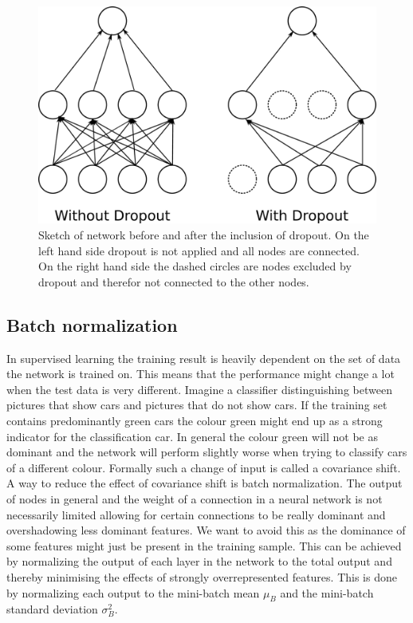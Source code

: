 \begin{figure}
	\centering
	\includegraphics[scale = 0.1]{figures_ML/dropout.eps}
	\caption{Sketch of network before and after the inclusion of dropout. On the left hand side dropout is not applied and all nodes are connected. On the right hand side the dashed circles are nodes excluded by dropout and therefor not connected to the other nodes.}
	\label{fig:dropout}
\end{figure}



\subsection{Batch normalization}
\label{sec:batch_norm}

In supervised learning the training result is heavily dependent on the set of data the network is trained on. This means that the performance might change a lot when the test data is very different. Imagine a classifier distinguishing between pictures that show cars and pictures that do not show cars. If the training set contains predominantly green cars the colour green might end up as a strong indicator for  the classification car. In general the colour green will not be as dominant and the network will perform slightly worse when trying to classify cars of a different colour. Formally such a change of input is called a covariance shift.\\
A way to reduce the effect of covariance shift is batch normalization. The output of nodes in general and the weight of a connection in a neural network is not necessarily limited allowing for certain connections to be really dominant and overshadowing less dominant features. We want to avoid this as the dominance of some features might just be present in the training sample. This can be achieved by normalizing the output of each layer in the network to the total output and thereby minimising the effects of strongly overrepresented features. This is done by normalizing each output to the mini-batch mean $\mu_B$ and the mini-batch standard deviation $\sigma_B^2$.

